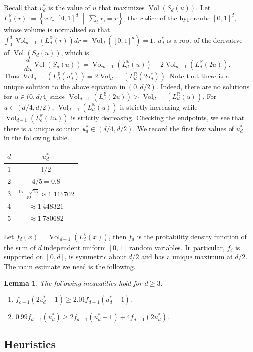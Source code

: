 \documentclass{article}
\newcommand{\setcond}[2]{\left\{ #1 \;\middle\vert\; #2 \right\}}
\newcommand{\RR}{\mathbb{R}}
\newtheorem{lem}[thm]{Lemma}
\theoremstyle{definition}
\DeclareMathOperator{\Vol}{Vol}
\begin{document}
Recall that $u_d^*$ is the value of $u$ that maximizes $\Vol(S_d(u))$. Let $L_d^{\RR}(r) := \setcond{x\in [0,1]^d}{\sum_i x_i = r}$, the $r$-slice of the hypercube $[0,1]^d$, whose volume is normalised so that $\int_0^d \Vol_{d-1}(L_d^{\RR}(r))dr=\Vol_d([0,1]^d)=1$. $u_d^*$ is a root of the derivative of $\Vol(S_d(u))$, which is
\[\frac{d}{du}\Vol(S_d(u)) = \Vol_{d-1}(L_d^{\RR}(u)) - 2\Vol_{d-1}(L_d^{\RR}(2u)).\]
Thus $\Vol_{d-1}(L_d^{\RR}(u_d^*))=2\Vol_{d-1}(L_d^{\RR}(2u_d^*))$. Note that there is a unique solution to the above equation in $(0,d/2)$. Indeed, there are no solutions for $u\in (0,d/4]$ since $\Vol_{d-1}(L_d^{\RR}(2u))>\Vol_{d-1}(L_d^{\RR}(u))$. For $u\in (d/4,d/2)$, $\Vol_{d-1}(L_d^{\RR}(u))$ is strictly increasing while $\Vol_{d-1}(L_d^{\RR}(2u))$ is strictly decreasing. Checking the endpoints, we see that there is a unique solution $u_d^*\in (d/4,d/2)$. We record the first few values of $u_d^*$ in the following table.
\begin{center}
\begin{tabular}{c|c}
$d$ & $u_d^*$ \\
\hline
1 & $1/2$ \\
2 & $4/5=0.8$ \\
3 & $\frac{15-\sqrt{15}}{10}\approx 1.112702$ \\
4 & $\approx 1.448321$ \\
5 & $\approx 1.780682$ \\
\end{tabular}
\end{center}

Let $f_d(x)=\Vol_{d-1}(L_d^{\RR}(x))$, then $f_d$ is the probability density function of the sum of $d$ independent uniform $[0,1]$ random variables. In particular, $f_d$ is supported on $[0,d]$, is symmetric about $d/2$ and has a unique maximum at $d/2$. The main estimate we need is the following.

\begin{lem} \label{lem:real-layer-estimate}
    The following inequalities hold for $d\geq 3$.
    \begin{enumerate}
        \item $f_{d-1}(2u_d^*-1)\geq 2.01f_{d-1}(u_d^*-1).$
        \item $0.99f_{d-1}(u_d^*)\geq 2f_{d-1}(u_d^*-1)+4f_{d-1}(2u_d^*).$
    \end{enumerate}
\end{lem}

\subsection{Heuristics}
\end{document}
